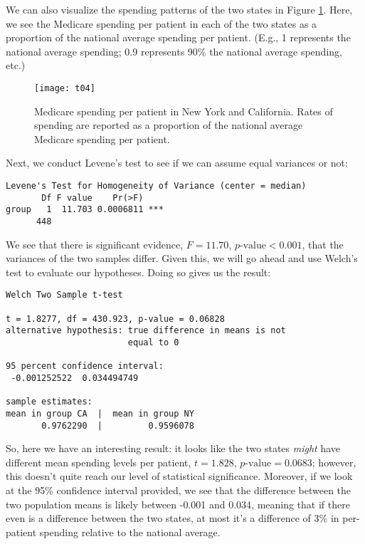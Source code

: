 We can also visualize the spending patterns of the two states in Figure \ref{fig:t03}. Here, we see the Medicare spending per patient in each of the two states as a proportion of the national average spending per patient. (E.g., 1 represents the national average spending; 0.9 represents 90\% the national average spending, etc.)

\begin{figure}[htp]
\texttt{[image: t04]}
\caption{Medicare spending per patient in New York and California. Rates of spending are reported as a proportion of the national average Medicare spending per patient.}
\label{fig:t03}
\end{figure}

Next, we conduct Levene's test to see if we can assume equal variances or not:
\begin{framed}
\begin{Verbatim}[samepage=TRUE]
Levene's Test for Homogeneity of Variance (center = median)
       Df F value    Pr(>F)    
group   1  11.703 0.0006811 ***
      448  
\end{Verbatim}
\end{framed}

We see that there is significant evidence, $F=11.70$, $p\text{-value}<0.001$, that the variances of the two samples differ. Given this, we will go ahead and use Welch's test to evaluate our hypotheses. Doing so gives us the result:
\begin{framed}
\begin{Verbatim}[samepage=TRUE]
	Welch Two Sample t-test

t = 1.8277, df = 430.923, p-value = 0.06828
alternative hypothesis: true difference in means is not
                        equal to 0

95 percent confidence interval:
 -0.001252522  0.034494749

sample estimates:
mean in group CA  |  mean in group NY 
       0.9762290  |         0.9596078 
\end{Verbatim}
\end{framed}

So, here we have an interesting result: it looks like the two states \textit{might} have different mean spending levels per patient, $t=1.828$, $p\text{-value}=0.0683$; however, this doesn't quite reach our level of statistical significance. Moreover, if we look at the 95\% confidence interval provided, we see that the difference between the two population means is likely between -0.001 and 0.034, meaning that if there even is a difference between the two states, at most it's a difference of 3\% in per-patient spending relative to the national average.

